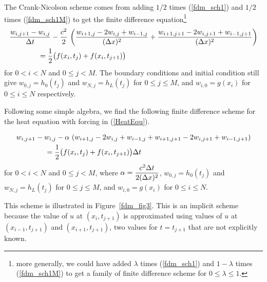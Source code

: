 The Crank-Nicolson scheme comes from adding $1/2$ times (\ref{fdm_sch1})
and $1/2$ times (\ref{fdm_sch1M}) to get the finite difference
equation\footnote{more generally, we could
have added $\lambda$ times (\ref{fdm_sch1}) and $1-\lambda$ times
(\ref{fdm_sch1M}) to get a family of finite difference scheme for
$0\leq \lambda \leq 1$.}
\begin{equation} \label{fdm_sch11}
\begin{split}
&\frac{w_{i,j+1}- w_{i,j}}{\Delta{t}} - \frac{c^2}{2} \,
\left( \frac{w_{i+1,j} - 2w_{i,j} + w_{i-1,j}}{(\Delta{x})^2}
+ \frac{w_{i+1,j+1} - 2w_{i,j+1} + w_{i-1,j+1}}{(\Delta{x})^2} \right) \\
& \qquad \qquad = \frac{1}{2} \big( f(x_i,t_j) + f(x_i,t_{j+1})\big)
\end{split}
\end{equation}
for $0 < i  < N$ and $0 \leq j < M$.  The boundary conditions and
initial condition still give $w_{0,j} = h_0(t_j)$ and $w_{N,j} = h_L(t_j)$
for $0\leq j \leq M$, and $w_{i,0} = g(x_i)$ for $0 \leq i \leq N$
respectively.

Following some simple algebra, we find the following finite difference
scheme for the heat equation with forcing in (\ref{HeatEqu}).

\begin{algo} \label{fdm_sch11S}
\begin{align*}
& w_{i,j+1} - w_{i,j} - \alpha \,
\left( w_{i+1,j} - 2w_{i,j} + w_{i-1,j}
  + w_{i+1,j+1} - 2w_{i,j+1} + w_{i-1,j+1} \right) \\
&\qquad \qquad = \frac{1}{2}\big( f(x_i,t_j) + f(x_i,t_{j+1}) \big) \Delta{t}
\end{align*}
for $0 < i <N$ and $0 \leq j < M$, where 
$\displaystyle \alpha = \frac{c^2\Delta{t}}{2 (\Delta{x})^2}$,
$w_{0,j} = h_0(t_j)$ and $w_{N,j} = h_L(t_j)$ for $0\leq j \leq M$, and
$w_{i,0} = g(x_i)$ for $0 \leq i \leq N$.
\end{algo}


This scheme is illustrated in Figure~\ref{fdm_fig3}.  This is an
implicit scheme because the value of $u$ at $(x_i,t_{j+1})$ is
approximated using values of $u$ at $(x_{i-1},t_{j+1})$ and
$(x_{i+1},t_{j+1})$, two values for $t = t_{j+1}$ that are not explicitly
known.

